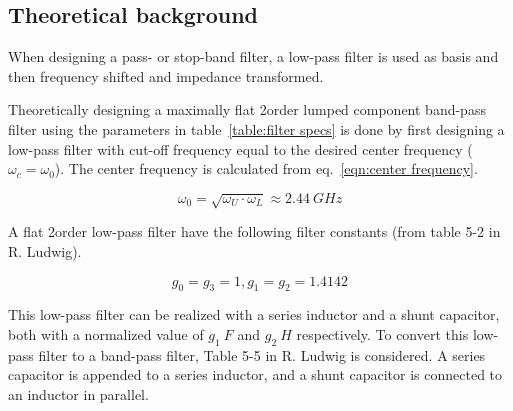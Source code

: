 \documentclass[report.tex]{subfiles}
\begin{document}
\subsection{Theoretical background}
When designing a pass- or stop-band filter, a low-pass filter is used as basis and then frequency shifted and impedance transformed. 

Theoretically designing a maximally flat 2\nd order lumped component band-pass filter using the parameters in table~\ref{table:filter specs} is done by first designing a low-pass filter with cut-off frequency equal to the desired center frequency ($\omega_c=\omega_0$). The center frequency is calculated from eq.~\ref{eqn:center frequency}.

\begin{equation}
    \omega_0 = \sqrt{\omega_U \cdot \omega_L} \approx 2.44~GHz
    \label{eqn:center frequency}
\end{equation}

A flat 2\nd order low-pass filter have the following filter constants (from table 5-2 in R. Ludwig).

\begin{equation*}
    g_0=g_3=1, g_1=g_2=1.4142
\end{equation*}

This low-pass filter can be realized with a series inductor and a shunt capacitor, both with a normalized value of $g_1~F$ and $g_2~H$ respectively. To convert this low-pass filter to a band-pass filter, Table 5-5 in R. Ludwig is considered. A series capacitor is appended to a series inductor, and a shunt capacitor is connected to an inductor in parallel.
\end{document}
